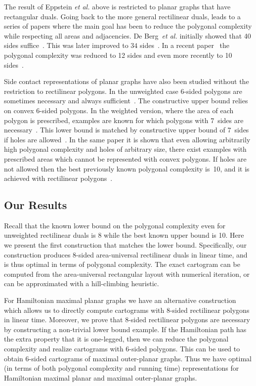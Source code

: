 \documentclass[11pt]{article}
\begin{document}
The result of Eppstein {\em et al.} above is restricted to planar
graphs that have rectangular duals. Going back to the more general
rectilinear duals, leads to a series of papers where the
main goal has been to reduce the polygonal complexity while respecting
all areas and adjacencies.
 De Berg~{\em et al.}
initially showed that 40 sides suffice~\cite{deBerg07}. This was later
improved to $34$ sides~\cite{Nagamochi}. In a recent paper~\cite{BR-WADS11}
the polygonal
complexity was reduced to 12 sides and even more recently to 10
sides~\cite{ABFGKK11}.

Side contact representations of planar graphs have also been
studied without the restriction to rectilinear polygons. In the
unweighted case 6-sided polygons are sometimes necessary
and always sufficient~\cite{ghkk10}. The constructive upper bound relies on convex 6-sided polygons.
In the weighted version,
where the area of each polygon is prescribed, examples are known for which
polygons with 7~sides are necessary~\cite{ueck-phd}.
This lower bound is matched by constructive upper bound of 7~sides if holes are allowed~\cite{AlaBieFelKauKob11}.
In the same paper it is shown that even allowing arbitrarily high polygonal complexity and holes of
arbitrary size, there exist examples with prescribed areas which cannot be represented with convex polygons. If holes
are not allowed then the best previously known polygonal complexity is~10, and it is achieved with rectilinear polygons~\cite{ABFGKK11}.



\subsection{Our Results}

Recall that the known lower bound on the polygonal complexity even for
unweighted rectilinear duals is 8
while the best known upper
bound is 10. Here we present
the first construction that matches the lower bound.
Specifically, our construction produces 8-sided area-universal rectilinear duals
 in linear time, and is thus optimal in terms of polygonal
 complexity.  The exact cartogram can be computed from the area-universal rectangular layout with numerical iteration, or can be approximated with a hill-climbing heuristic.


For Hamiltonian maximal planar graphs we have an alternative construction
which allows us to directly compute cartograms with 8-sided rectilinear
polygons in linear time. Moreover, we prove that 8-sided rectilinear polygons
are necessary by constructing a non-trivial lower bound example.  If the
Hamiltonian path has the extra property that it is one-legged, then we can
reduce the polygonal complexity and realize cartograms with 6-sided polygons.
This can be used to obtain 6-sided cartograms of maximal outer-planar graphs.
Thus we have optimal (in terms of both polygonal complexity and running time)
representations for Hamiltonian maximal planar and maximal outer-planar
graphs.
\end{document}
